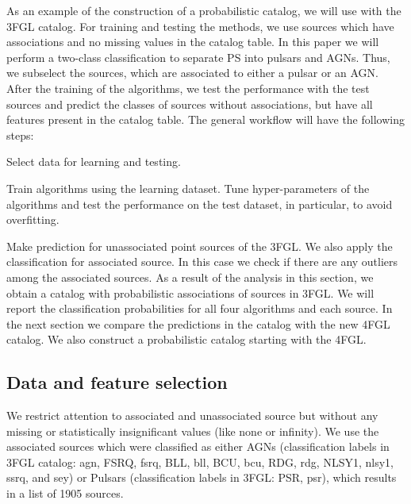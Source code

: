 As an example of the construction of a probabilistic catalog, we will use with the 3FGL catalog.
For training and testing the methods, we use sources which have associations and no missing values in the catalog table.
In this paper we will perform a two-class classification to separate PS into pulsars and AGNs.
Thus, we subselect the sources, which are associated to either a pulsar or an AGN.
After the training of the algorithms, we test the performance with the test sources and predict the classes of sources without associations,
but have all features present in the catalog table.
The general workflow will have the following steps:
\ben
\item
Select data for learning and testing.
\item
Train algorithms using the learning dataset.
Tune hyper-parameters of the algorithms and test the performance on the test dataset, in particular, to avoid overfitting.
\item
Make prediction for unassociated point sources of the 3FGL.
We also apply the classification for associated source. In this case we check if there are any outliers among the associated sources.
\een
As a result of the analysis in this section, we obtain a catalog with probabilistic associations of sources in 3FGL.
We will report the classification probabilities for all four algorithms and each source.
In the next section we compare the predictions in the catalog with the new 4FGL catalog.
We also construct a probabilistic catalog starting with the 4FGL.


\subsection{Data and feature selection}

We restrict attention to associated and unassociated source but without any missing or statistically insignificant values (like none or infinity). 
We use the associated sources which were classified as either AGNs (classification labels in 3FGL catalog: agn, FSRQ, fsrq, BLL, bll, BCU, bcu, RDG, rdg, NLSY1, nlsy1, ssrq, and sey) or Pulsars (classification labels in 3FGL: PSR, psr), which results in a list of 1905 sources. 

